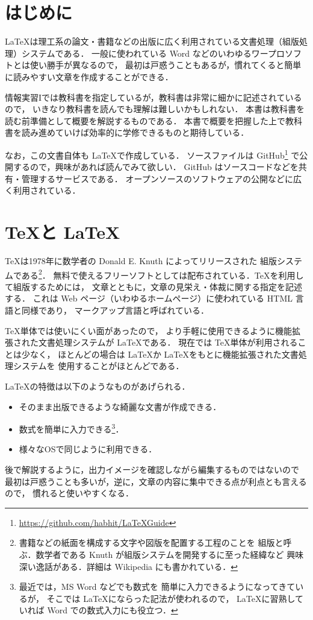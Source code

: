 \section{はじめに}

\LaTeX は理工系の論文・書籍などの出版に広く利用されている文書処理（組版処理）システムである．
一般に使われている Word などのいわゆるワープロソフトとは使い勝手が異なるので，
最初は戸惑うこともあるが，慣れてくると簡単に読みやすい文章を作成することができる．

情報実習Iでは教科書\cite{TeXText}を指定しているが，教科書は非常に細かに記述されているので，
いきなり教科書を読んでも理解は難しいかもしれない．
本書は教科書を読む前準備として概要を解説するものである．
本書で概要を把握した上で教科書を読み進めていけば効率的に学修できるものと期待している．

なお，この文書自体も \LaTeX で作成している．
ソースファイルは GitHub\footnote{\url{https://github.com/habhit/LaTeXGuide}}
で公開するので，興味があれば読んでみて欲しい．
GitHub はソースコードなどを共有・管理するサービスである．
オープンソースのソフトウェアの公開などに広く利用されている．

\section{\TeX と \LaTeX}
\label{sec:TeXandLaTeX}

\TeX は1978年に数学者の Donald E. Knuth によってリリースされた
組版システムである\footnote{書籍などの紙面を構成する文字や図版を配置する工程のことを
組版と呼ぶ．数学者である Knuth が組版システムを開発するに至った経緯など
興味深い逸話がある．詳細は Wikipedia にも書かれている．}．
無料で使えるフリーソフトとしては配布されている．TeXを利用して組版するためには，
文章とともに，文章の見栄え・体裁に関する指定を記述する．
これは Web ページ（いわゆるホームページ）に使われている HTML 言語と同様であり，
マークアップ言語と呼ばれている．

\TeX 単体では使いにくい面があったので，
より手軽に使用できるように機能拡張された文書処理システムが \LaTeX である．
現在では \TeX 単体が利用されることは少なく，
ほとんどの場合は \LaTeX か \LaTeX をもとに機能拡張された文書処理システムを
使用することがほとんどである．

\LaTeX の特徴は以下のようなものがあげられる．
\begin{itemize}
\item そのまま出版できるような綺麗な文書が作成できる．
\item 数式を簡単に入力できる\footnote{最近では，MS Word などでも数式を
簡単に入力できるようになってきているが，
そこでは \LaTeX にならった記法が使われるので，
\LaTeX に習熟していれば Word での数式入力にも役立つ．}．
\item 様々なOSで同じように利用できる．
\end{itemize}
後で解説するように，出力イメージを確認しながら編集するものではないので
最初は戸惑うことも多いが，逆に，文章の内容に集中できる点が利点とも言えるので，
慣れると使いやすくなる．

